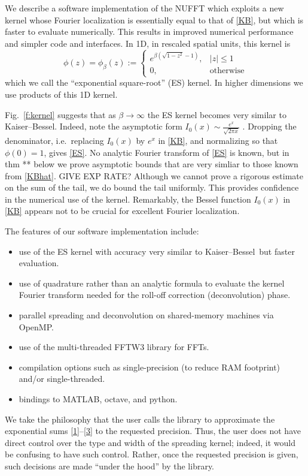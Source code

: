 \documentclass[10pt]{article}
\newcommand{\bi}{\begin{itemize}}
\newcommand{\ei}{\end{itemize}}
\newcommand{\be}{\begin{equation}}
\newcommand{\ee}{\end{equation}}
\newcommand{\freq}{\beta}          %
\newcommand{\KB}{Kaiser--Bessel}
\begin{document}
We describe a software implementation of the NUFFT
which exploits a new kernel whose Fourier localization 
is essentially equal to that of \eqref{KB},
but which is faster to evaluate numerically.
This results in improved numerical performance and simpler code and interfaces.
In 1D, in rescaled spatial units, this kernel is
\be
\phi(z) = \phi_\freq(z) :=
\left\{\begin{array}{ll}
e^{\freq (\sqrt{1-z^2}-1)}, & |z|\le 1\\
0, & \mbox{otherwise}
\end{array}
\right.
\label{ES}
\ee
which we call the ``exponential square-root'' (ES) kernel.
In higher dimensions we use products of this 1D kernel.

Fig.~\ref{f:kernel} suggests that as $\freq\to\infty$ the ES kernel
becomes very similar to \KB.
Indeed, note the asymptotic form
$I_0(x) \sim \frac{e^x}{\sqrt{2\pi x}}$ \cite[(10.30.4)]{dlmf}.
Dropping the denominator, i.e.\ replacing $I_0(x)$ by $e^x$ in \eqref{KB},
and normalizing so that $\phi(0)=1$, gives \eqref{ES}.
No analytic Fourier transform of \eqref{ES} is known,
but in thm ** below we prove asymptotic
bounds that are very simliar to those known
from \eqref{KBhat}.
GIVE EXP RATE?
Although we cannot prove a rigorous estimate on the sum of the tail,
we do bound the tail uniformly.
This provides confidence in the numerical use of the kernel.
Remarkably, the Bessel function $I_0(x)$ in \eqref{KB}
appears not to be crucial for excellent Fourier localization.


The features of our software implementation include:
\bi
\item use of the ES kernel with accuracy very similar to \KB\ but
  faster evaluation.
\item use of quadrature rather than an analytic formula to evaluate
  the kernel Fourier transform needed for the roll-off correction
  (deconvolution) phase.
\item parallel spreading and deconvolution on shared-memory machines via OpenMP.
\item use of the multi-threaded FFTW3 library for FFTs.
\item compilation options such as single-precision (to reduce RAM footprint)
  and/or single-threaded.
\item bindings to MATLAB, octave, and python.
\ei

We take the philosophy that the user calls the library to approximate the
exponential sums \eqref{1}--\eqref{3} to the requested precision.
Thus, the user does not have direct control over the type and width of
the spreading kernel; indeed, it would be confusing to have such control.
Rather, once the requested precision is given, such decisions
are made ``under the hood'' by the library.
\end{document}

